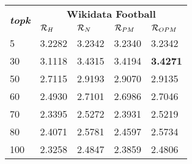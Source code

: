 


%
%
%

\begin{tabular}{|l|llll|}
\hline
       \multirow{2}{*}{\textbf{\textit{topk}}}          & \multicolumn{4}{c|}{\textbf{Wikidata Football}}      \\ \cline{2-5} 
 & $\mathcal{R}_{H}$ & $\mathcal{R}_{N}$ & $\mathcal{R}_{PM}$ & $\mathcal{R}_{OPM}$ \\ \hline
5  & 3.2282 & 3.2342 & 3.2340 & 3.2342\\ %
30   & 3.1118 & 3.4315 & 3.4194 & \textbf{3.4271}\\ %
50   & 2.7115 & 2.9193 & 2.9070 & 2.9135\\ %
60   & 2.4930 & 2.7101 & 2.6986 & 2.7046\\ %
70   & 2.3395 & 2.5272 & 2.3931 & 2.5219\\ %
80   & 2.4071 & 2.5781 & 2.4597 & 2.5734\\ %
100   & 2.3258 & 2.4847 & 2.3859 & 2.4806\\ \hline

\end{tabular}

